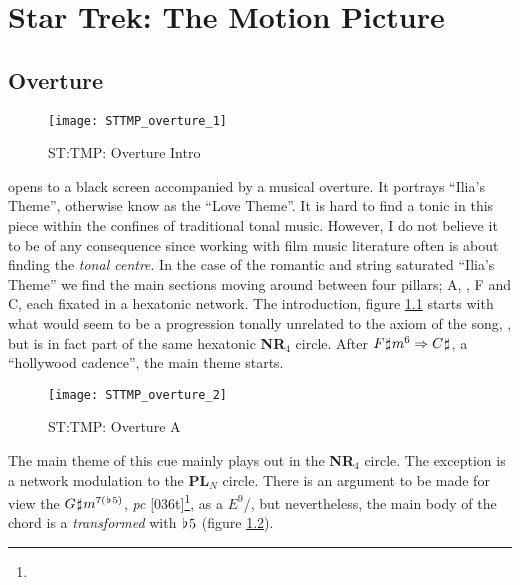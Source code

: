 
\chapter{Star Trek: The Motion Picture}\label{ch:sttmp}

\section{Overture}
\begin{figure}
\center
\texttt{[image: STTMP\_overture\_1]}
	\caption{ST:TMP: Overture Intro}
	\label{fg:sttmp_overture_1}
\end{figure}

\noindent{} opens to a black screen accompanied by a musical overture. It portrays ``Ilia's Theme'', otherwise know as the ``Love Theme''. It is hard to find a tonic in this piece within the confines of traditional tonal music. However, I do not believe it to be of any consequence since working with film music literature often is about finding the \textit{tonal centre}. In the case of the romantic and string saturated ``Ilia's Theme'' we find the main sections moving around between four pillars; A, \ciss, F and C, each fixated in a hexatonic network. The introduction, figure \ref{fg:sttmp_overture_1} starts with what would seem to be a progression tonally unrelated to the axiom of the song, \ciss, but is in fact part of the same hexatonic \textbf{NR\(_{4}\)} circle. After \(F\hspace*{0.18ex}\sharp\hspace*{0.18ex}{m}^{6}\Rightarrow{C\hspace*{0.18ex}\sharp\hspace*{0.18ex}}\), a ``hollywood cadence'', the main theme starts. 
\begin{figure}
\center
\texttt{[image: STTMP\_overture\_2]}
	\caption{ST:TMP: Overture A}
	\label{fg:sttmp_overture_2}
\end{figure}

The main theme of this cue mainly plays out in the \textbf{NR\(_{4}\)} circle. The exception is a network modulation to the \textbf{PL\(_{N}\)} circle. There is an argument to be made for view the \(G\hspace*{0.18ex}\sharp\hspace*{0.18ex}{m}^{7(\hspace*{0.18ex}\flat\hspace*{0.18ex}{5})}\), \textit{pc} [036t]\footnote{}, as a \(E^{9}\)/\giss, but nevertheless, the main body of the chord is a \gissm \textit{transformed} with \(\hspace*{0.18ex}\flat\hspace*{0.18ex}{5}\) (figure \ref{fg:sttmp_overture_2}).


